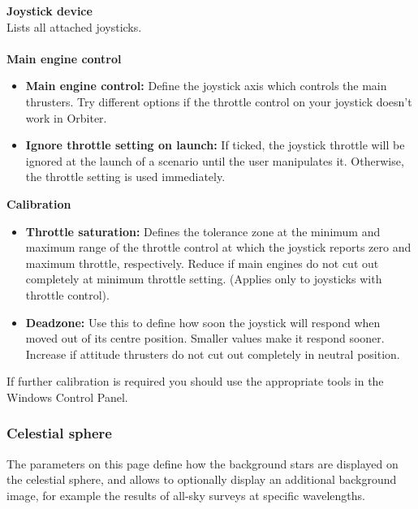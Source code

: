 \documentclass[Orbiter User Manual.tex]{subfiles}
\begin{document}
\begin{figure}[H]
	\centering
\end{figure}

\noindent
\textbf{Joystick device}\\
Lists all attached joysticks.\\
\\
\noindent
\textbf{Main engine control}
\begin{itemize}
\item \textbf{Main engine control:} Define the joystick axis which controls the main thrusters. Try different options if the throttle control on your joystick doesn't work in Orbiter.
\item \textbf{Ignore throttle setting on launch:} If ticked, the joystick throttle will be ignored at the launch of a scenario until the user manipulates it. Otherwise, the throttle setting is used immediately.
\end{itemize}

\noindent
\textbf{Calibration}
\begin{itemize}
\item \textbf{Throttle saturation:} Defines the tolerance zone at the minimum and maximum range of the throttle control at which the joystick reports zero and maximum throttle, respectively. Reduce if main engines do not cut out completely at minimum throttle setting. (Applies only to joysticks with throttle control).
\item \textbf{Deadzone:} Use this to define how soon the joystick will respond when moved out of its centre position. Smaller values make it respond sooner. Increase if attitude thrusters do not cut out completely in neutral position.
\end{itemize}

\noindent
If further calibration is required you should use the appropriate tools in the Windows Control Panel.

\subsubsection{Celestial sphere}
The parameters on this page define how the background stars are displayed on the celestial sphere, and allows to optionally display an additional background image, for example the results of all-sky surveys at specific wavelengths.

\begin{figure}[H]
	\centering
\end{figure}
\end{document}
